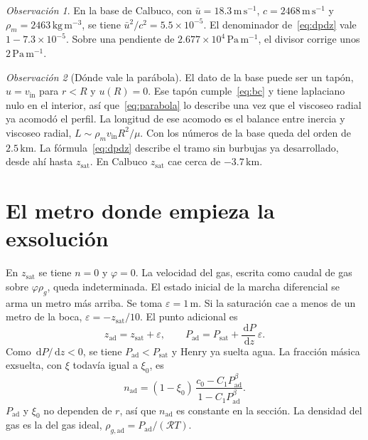 \documentclass[11pt,a4paper]{article}
\newcommand{\dd}{\,\mathrm{d}}
\newcommand{\sat}{\mathrm{sat}}
\newcommand{\ad}{\mathrm{ad}}
\newcommand{\Rv}{\mathcal{R}}
\theoremstyle{plain}
\theoremstyle{definition}
\theoremstyle{remark}
\newtheorem*{obs}{Observación}
\begin{document}
\begin{obs}
En la base de Calbuco, con \(\bar u=18.3\,\mathrm{m\,s^{-1}}\),
\(c=2468\,\mathrm{m\,s^{-1}}\) y \(\rho_m=2463\,\mathrm{kg\,m^{-3}}\),
se tiene \(\bar u^2/c^2=5.5\times 10^{-5}\).
El denominador de~\eqref{eq:dpdz} vale \(1-7.3\times 10^{-5}\).
Sobre una pendiente de \(2.677\times 10^4\,\mathrm{Pa\,m^{-1}}\),
el divisor corrige unos \(2\,\mathrm{Pa\,m^{-1}}\).
\end{obs}

\begin{obs}[Dónde vale la parábola]
El dato de la base puede ser un tapón, \(u=v_{\mathrm{in}}\) para \(r<R\)
y \(u(R)=0\). Ese tapón cumple~\eqref{eq:bc} y tiene laplaciano nulo en el
interior, así que~\eqref{eq:parabola} lo describe una vez que el viscoseo
radial ya acomodó el perfil. La longitud de ese acomodo es el balance entre
inercia y viscoseo radial, \(L\sim\rho_m v_{\mathrm{in}} R^2/\mu\).
Con los números de la base queda del orden de \(2.5\,\mathrm{km}\).
La fórmula~\eqref{eq:dpdz} describe el tramo sin burbujas ya desarrollado,
desde ahí hasta \(z_{\sat}\). En Calbuco \(z_{\sat}\) cae cerca de
\(-3.7\,\mathrm{km}\).
\end{obs}

\section{El metro donde empieza la exsolución}
\label{sec:eps}

En \(z_{\sat}\) se tiene \(n=0\) y \(\varphi=0\). La velocidad del gas,
escrita como caudal de gas sobre \(\varphi\rho_g\), queda indeterminada.
El estado inicial de la marcha diferencial se arma un metro más arriba.
Se toma \(\varepsilon=1\,\mathrm{m}\). Si la saturación cae a menos de un
metro de la boca, \(\varepsilon=-z_{\sat}/10\). El punto adicional es
\begin{equation}
z_{\ad}=z_{\sat}+\varepsilon,
\qquad
P_{\ad}
=
P_{\sat}+\frac{\dd P}{\dd z}\,\varepsilon.
\label{eq:Pad}
\end{equation}
Como \(\dd P/\dd z<0\), se tiene \(P_{\ad}<P_{\sat}\) y Henry ya suelta agua.
La fracción másica exsuelta, con \(\xi\) todavía igual a \(\xi_0\), es
\begin{equation}
n_{\ad}
=
(1-\xi_0)\,
\frac{c_0-C_1 P_{\ad}^{\beta}}{1-C_1 P_{\ad}^{\beta}}.
\label{eq:n}
\end{equation}
\(P_{\ad}\) y \(\xi_0\) no dependen de \(r\), así que \(n_{\ad}\) es
constante en la sección. La densidad del gas es la del gas ideal,
\(\rho_{g,\ad}=P_{\ad}/(\Rv T)\).
\end{document}
